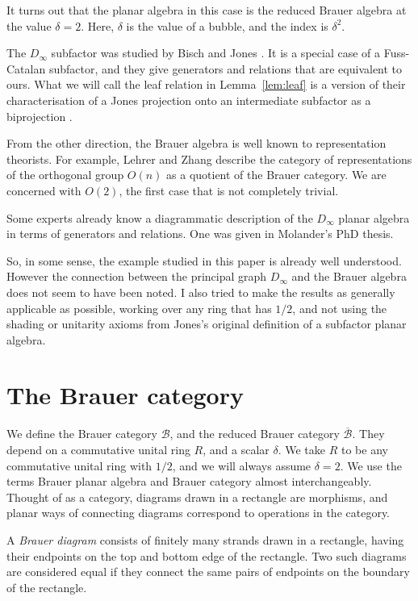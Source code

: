 \documentclass{article}
\begin{document}
It turns out that the planar algebra in this case is the reduced Brauer
algebra at the value $\delta=2$.  Here, $\delta$ is the value of a bubble,
and the index is $\delta^2$.

The $D_\infty$ subfactor was studied by Bisch and Jones \cite{MR1437496}.
It is a special case of a Fuss-Catalan subfactor, and they give generators
and relations that are equivalent to ours.  What we will call the leaf
relation in Lemma~\ref{lem:leaf} is a version of their characterisation
of a Jones projection onto an intermediate subfactor as a biprojection
\cite{MR1733737}.

From the other direction, the Brauer algebra is well known to
representation theorists.  For example, Lehrer and Zhang \cite{MR3420509}
describe the category of representations of the orthogonal group $O(n)$
as a quotient of the Brauer category.  We are concerned with $O(2)$,
the first case that is not completely trivial.

Some experts already know a diagrammatic description of the $D_\infty$
planar algebra in terms of generators and relations.  One was given in
Molander's PhD thesis.

So, in some sense, the example studied in this paper is already well
understood.  However the connection between the principal graph $D_\infty$
and the Brauer algebra does not seem to have been noted.  I also tried
to make the results as generally applicable as possible, working over
any ring that has $1/2$, and not using the shading or unitarity axioms
from Jones's original definition of a subfactor planar algebra.

\section{The Brauer category}
\label{sec:brauer}

We define the Brauer category $\mathcal{B}$, and the reduced Brauer
category $\overline{\mathcal{B}}$.  They depend on a commutative unital
ring $R$, and a scalar $\delta$.  We take $R$ to be any commutative
unital ring with $1/2$, and we will always assume $\delta=2$.  We use the
terms Brauer planar algebra and Brauer category almost interchangeably.
Thought of as a category, diagrams drawn in a rectangle are morphisms,
and planar ways of connecting diagrams correspond to operations in
the category.

A \emph{Brauer diagram} consists of finitely many strands drawn in a
rectangle, having their endpoints on the top and bottom edge of the
rectangle.  Two such diagrams are considered equal if they connect the
same pairs of endpoints on the boundary of the rectangle.
\end{document}
